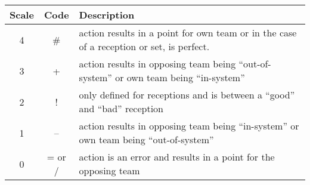 \begin{tabular}{ccl}
    Scale & Code          & Description\\
    \hline
    4   & \#            & action results in a point for own team or in the case of a reception or set, is perfect.\\
    3   & +             & action results in opposing team being ``out-of-system'' or own team being ``in-system''\\
    2   & !             & only defined for receptions and is between a ``good'' and ``bad'' reception\\
    1   & --            & action results in opposing team being ``in-system'' or own team being ``out-of-system''\\
    0   & = or \slash   & action is an error and results in a point for the opposing team\\
\end{tabular}